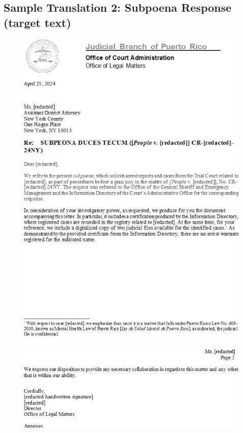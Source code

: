 \documentclass{article}
\begin{document}
\subsection{Sample Translation 2: Subpoena Response (target text)}

\begin{figure}[H]
	\centering
	\includegraphics[width=\textwidth]{../sample_translations/target_2_1.png}
\end{figure}

\begin{figure}[H]
	\centering
	\includegraphics[width=\textwidth]{../sample_translations/target_2_2.png}
\end{figure}
\end{document}

